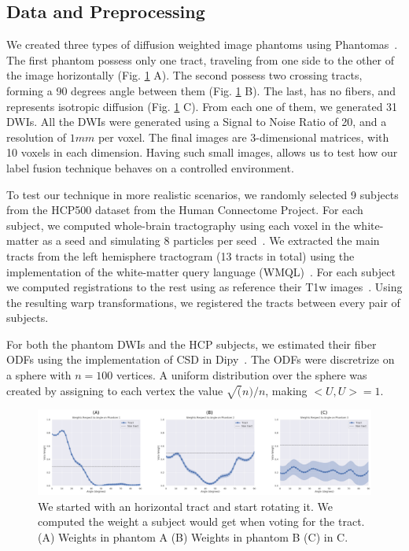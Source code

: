 \subsection{Data and Preprocessing}
We created three types of diffusion weighted image phantoms using Phantomas~\cite{Caruyer2014}.
The first phantom possess only one tract, traveling from one side to the other of the
image horizontally (Fig. \ref{fig:pha_exp_1} A). The second possess two crossing tracts,
forming a 90 degrees angle between them (Fig. \ref{fig:pha_exp_1} B). The last, has no
fibers, and represents isotropic diffusion (Fig. \ref{fig:pha_exp_1} C). From
each one of them, we generated 31 DWIs. All the DWIs were generated using a
Signal to Noise Ratio of 20, and a resolution of $1mm$ per voxel. The final
images are 3-dimensional matrices, with 10 voxels in each dimension. Having
such small images, allows us to test how our label fusion technique behaves
on a controlled environment.

To test our technique in more realistic scenarios, we randomly selected 9 subjects
from the HCP500 dataset from the Human Connectome Project. For each subject,
we computed whole-brain tractography using each voxel in the white-matter as
a seed and simulating 8 particles per seed~\cite{Garyfallidis2014}. We extracted
the main tracts from the left hemisphere tractogram (13 tracts in total) using
the implementation of the white-matter query language (WMQL)~\cite{Wassermann2016}.
For each subject we computed registrations to the rest using as reference their
T1w images~\cite{Jenkinson2012}. Using the resulting warp transformations, we
registered the tracts between every pair of subjects.

For both the phantom DWIs and the HCP subjects, we estimated their fiber ODFs
using the implementation of CSD in Dipy~\cite{Garyfallidis2014}. The ODFs were
discretrize on a sphere with $n=100$ vertices. A uniform distribution over the sphere
was created by assigning to each vertex the value $\sqrt(n)/n$, making $<U, U> = 1$.


\begin{figure}[t]
    \includegraphics[width=\textwidth]{7.multiatlas/img/weights.png}
    \caption{We started with an horizontal tract and start rotating it. We computed
             the weight a subject would get when voting for the tract. 
             (A) Weights in phantom A (B) Weights in phantom B (C) in C.}
    \label{fig:pha_exp_1}
\end{figure} 

